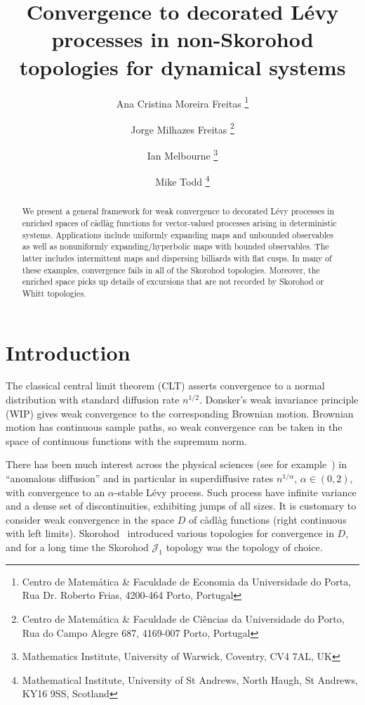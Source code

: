 \documentclass[12pt]{article}
\numberwithin{equation}{section}
\newcommand{\cJ}{{\mathcal J}}
\begin{document}
\title{Convergence to decorated L\'evy processes in non-Skorohod topologies for dynamical systems}


\author{Ana Cristina Moreira Freitas
\thanks{Centro de Matem\'{a}tica \& Faculdade de Economia da Universidade do Porta, Rua Dr. Roberto Frias,  4200-464 Porto, Portugal} 
\and
Jorge Milhazes Freitas
\thanks{Centro de Matem\'{a}tica \& Faculdade de Ci\^encias da Universidade do Porto, Rua do Campo Alegre 687, 4169-007 Porto, Portugal}
\and
Ian Melbourne
\thanks{Mathematics Institute, University of Warwick, Coventry, CV4 7AL, UK}
\and
Mike Todd
\thanks{Mathematical Institute, University of St Andrews,
North Haugh, St Andrews, KY16 9SS, Scotland}
}




\maketitle

\begin{abstract}
We present a general framework for weak convergence to decorated L\'evy processes in enriched spaces of c\`adl\`ag functions for vector-valued processes arising in deterministic systems. Applications include uniformly expanding maps and unbounded observables as well as nonuniformly expanding/hyperbolic maps with bounded observables. The latter includes intermittent maps and dispersing billiards with flat cusps.
In many of these examples, convergence fails in all of the Skorohod topologies.
Moreover, the enriched space picks up details of excursions that are not recorded by Skorohod or Whitt topologies.
\end{abstract}


 \section{Introduction} 
 \label{sec-intro}

The classical central limit theorem (CLT) asserts convergence to a normal distribution with standard diffusion rate $n^{1/2}$. Donsker's weak invariance principle (WIP) gives weak convergence to the corresponding Brownian motion.
Brownian motion has continuous sample paths, so weak convergence can be taken in the space of continuous functions with the supremum norm.

There has been much interest across the physical sciences
(see for example~\cite{BL,GaspardWang88, Gouezel04, KGSSR, MZ15, Metzler, PVHS, SamorodnitskyTaqqu, Swinney, Whitt}) 
in ``anomalous diffusion'' and in particular in superdiffusive rates $n^{1/\alpha}$, $\alpha\in(0,2)$, with convergence to an $\alpha$-stable L\'evy process.
Such process have infinite variance and a dense set of discontinuities, exhibiting jumps of all sizes. It is customary to consider weak convergence in the space $D$ of c\`adl\`ag functions (right continuous with left limits).
Skorohod~\cite{Skorohod56} introduced various topologies for convergence in $D$,
and 
for a long time the Skorohod $\cJ_1$ topology was the topology of choice. 
\end{document}
